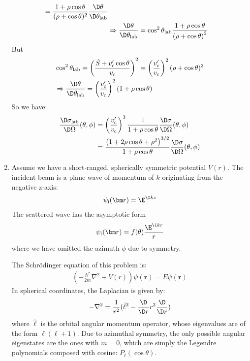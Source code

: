 \documentclass[fleqn, 12pt]{article}
\begin{document}
\begin{enumerate}
\begin{align*}
      = \frac{1 + \rho \cos \theta}{(\rho + \cos\theta)^2}
      \frac{\D \theta}{\D \theta_{\text{lab}}} \\
    &\Rightarrow \frac{\D \theta}{\D \theta_{\text{lab}}} =
      \cos^2 \theta_{\text{lab}}
      \frac{1 + \rho \cos \theta}{\left(\rho + \cos \theta\right)^2}
  \end{align*}
  But
  \begin{align*}
    &\cos^2 \theta_{\text{lab}}
    = \left(\frac{\dot S + v_{\text c}' \cos \theta}{v_{\text c}}\right)^2
    = \left(\frac{v_{\text c}'}{v_{\text c}}\right)^2 (\rho + \cos \theta)^2 \\
    &\Rightarrow \frac{\D \theta}{\D \theta_{\text{lab}}}
    =\left(\frac{v_{\text c}'}{v_{\text c}}\right)^2 \left(1 + \rho \cos \theta\right)
  \end{align*}
  So we have:
  \begin{align*}
    \frac{\D \sigma_{\text{lab}}}{\D \Omega} (\theta, \phi)
    &= \left(\frac{v_{\text c}'}{v_{\text c}}\right)^3
      \frac{1}{1 + \rho \cos \theta}
      \frac{\D \sigma}{\D \Omega} (\theta, \phi) \\
    &= \frac{\left(1 + 2 \rho \cos \theta + \rho^2 \right)^{3/2}
      }{1 + \rho \cos \theta}
      \frac{\D \sigma}{\D \Omega} (\theta, \phi)
  \end{align*}

\item Assume we have a short-ranged, spherically symmetric potential $V(r)$.
  The incident beam is a plane wave of momentum of $k$ originating from the
  negative z-axis:
  \begin{align*}
    \psi_{\text i}(\bm r) = \E^{\I k z}
  \end{align*}
  The scattered wave has the asymptotic form
  \begin{align*}
    \psi_{\text f}(\bm r) = f(\theta) \frac{\E^{\I k r}}{r}
  \end{align*}
  where we have omitted the azimuth $\phi$ due to symmetry.

  The Schr\"odinger equation of this problem is:
  \begin{align*}
    \left(-\frac{\hbar^2}{2 m} \nabla^2 + V(r)\right) \psi(\bm r)
    = E \psi(\bm r)
  \end{align*}
  In spherical coordinates, the Laplacian is given by:
  \begin{align*}
  -\nabla^2 = \frac{1}{r^2} (\hat \ell^2 - \frac{\D}{\D r} r^2 \frac{\D}{\D r})
  \end{align*}
  where $\hat{\bm \ell}$ is the orbital angular momentum operator, whose
  eigenvalues are of the form $\ell (\ell + 1)$.  Due to azimuthal symmetry,
  the only possible angular eigenstates are the ones with $m = 0$, which are
  simply the Legendre polynomials composed with cosine: $P_\ell(\cos \theta)$.


\end{enumerate}
\end{document}
